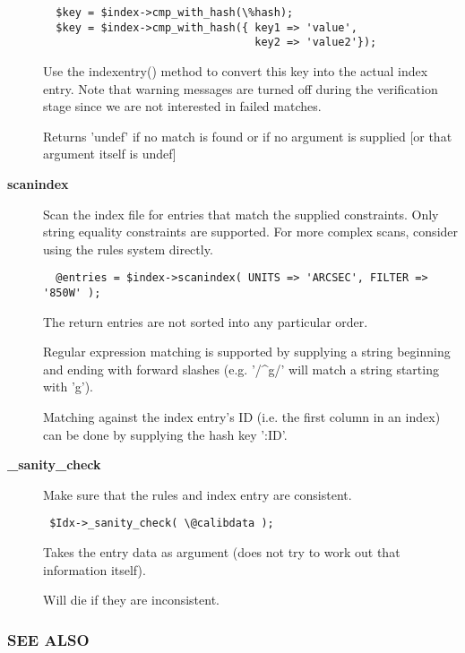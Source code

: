 \begin{description}
\begin{verbatim}
  $key = $index->cmp_with_hash(\%hash);
  $key = $index->cmp_with_hash({ key1 => 'value',
                                 key2 => 'value2'});
\end{verbatim}


Use the indexentry() method to convert this key into the actual
index entry. Note that warning messages are turned off during the
verification stage since we are not interested in failed matches.



Returns 'undef' if no match is found or if no argument is supplied
[or that argument itself is undef]


\item[{\textbf{scanindex}}] \mbox{}

Scan the index file for entries that match the supplied constraints.
Only string equality constraints are supported. For more complex scans,
consider using the rules system directly.

\begin{verbatim}
  @entries = $index->scanindex( UNITS => 'ARCSEC', FILTER => '850W' );
\end{verbatim}


The return entries are not sorted into any particular order.



Regular expression matching is supported by supplying a string
beginning and ending with forward slashes (e.g. '/\^{}g/' will match a
string starting with 'g').



Matching against the index entry's ID (i.e. the first column in an
index) can be done by supplying the hash key ':ID'.


\item[{\textbf{\_sanity\_check}}] \mbox{}

Make sure that the rules and index entry are consistent.

\begin{verbatim}
 $Idx->_sanity_check( \@calibdata );
\end{verbatim}


Takes the entry data as argument (does not try to
work out that information itself).



Will die if they are inconsistent.

\end{description}
\subsubsection*{SEE ALSO\label{ORAC::Index_SEE_ALSO}}


